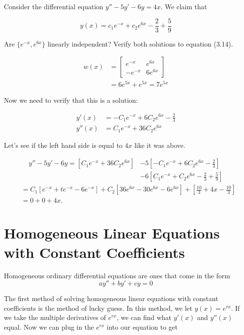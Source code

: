   \begin{problem}
    Consider the differential equation $y''-5y'-6y=4x$. We claim that 

    \[
      y(x)=c_1e^{-x}+c_2e^{6x}-\frac{2}{3}+\frac{5}{9}
    \]

    Are $\{e^{-x},e^{6x}\}$ linearly independent? Verify both solutions to equation (3.14).

    \begin{align*}
      w(x)&=\begin{bmatrix} e^{-x}&e^{6x}\\-e^{-x}&6e^{6x} \end{bmatrix} \\
          &=6e^{5x}+e^{5x}=7e^{5x}
    \end{align*}

    Now we need to verify that this is a solution:

    \begin{align*}
      y'(x)&=-C_1e^{-x}+6C_2e^{6x}-\frac{2}{3}\\
      y''(x)&=C_1e^{-x}+36C_2e^{6x}
    \end{align*}

     Let's see if the left hand side is equal to $4x$ like it was above.

     \begin{align*}
       y''-5y'-6y=\left[C_1e^{-x}+36C_2e^{6x}\right]&-5\left[-C_1e^{-x}+6C_2e^{6x}-\frac{2}{3}\right]\\
                                                    &-6\left[C_1e^{-x}+C_2e^{6x}-\frac{2}{3}+\frac{5}{9}\right]
     \end{align*}
     \begin{align*}
       &=C_1[e^{-x}+te^{-x}-6e^{-x}]+C_2[36e^{6x}-30e^{6x}-6e^{6x}]+\left[\frac{10}{3}+4x-\frac{10}{3}\right]\\
       &=0+0+4x
     .\end{align*}

  \end{problem}

\section{Homogeneous Linear Equations with Constant Coefficients}

  Homogeneous ordinary differential equations are ones that come in the form 
  \[
    ay''+by'+cy=0
  \]

  The first method of solving homogeneous linear equations with constant coefficients is the method of lucky guess. In this method, we let $y(x)=e^{rx}$. If we take the multiple derivatives of $e^{rx}$, we can find what $y'(x)$ and $y''(x)$ equal. Now we can plug in the $e^{rx}$ into our equation to get 

